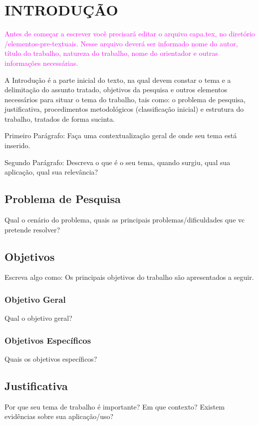 
\chapter{INTRODUÇÃO}
\label{chap:introducao}
\textcolor{magenta}
{Antes de começar a escrever você precisará editar o arquivo {\ttfamily capa.tex},  no diretório  {\ttfamily /elementos-pre-textuais}.
Nesse arquivo deverá ser informado nome do autor, título do trabalho, natureza do trabalho, nome do orientador e outras informações necessárias.}

A Introdução é a parte inicial do texto, na qual devem constar o tema e a delimitação do assunto tratado, objetivos da pesquisa e outros elementos necessários para situar o tema do trabalho, tais como: o problema de pesquisa, justificativa, procedimentos metodológicos (classificação inicial) e estrutura do trabalho, tratados de forma sucinta. 

Primeiro Parágrafo: Faça uma contextualização geral de onde seu tema está inserido. 

Segundo Parágrafo: Descreva o que é o seu tema, quando surgiu, qual sua aplicação, qual sua relevância?



\section{Problema de Pesquisa}
\label{sec:problema}
Qual o cenário do problema, quais as principais problemas/dificuldades que vc pretende resolver? 

\section{Objetivos}
Escreva algo como: Os principais objetivos do trabalho são apresentados a seguir.

\subsection{Objetivo Geral}
Qual o objetivo geral?


\subsection{Objetivos Específicos}
Quais os objetivos específicos?

\section{Justificativa}
Por que seu tema de trabalho é importante? Em que contexto? Existem evidências sobre sua aplicação/uso?

